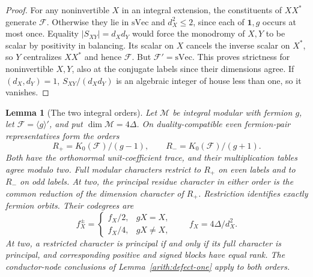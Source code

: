 \documentclass[11pt,a4paper]{article}
\numberwithin{equation}{section}
\newtheorem{lemma}[theorem]{Lemma}
\newcommand{\one}{\mathbf1}
\begin{document}
\begin{proof}
For any noninvertible $X$ in an integral extension, the constituents
of $XX^*$ generate $\mathcal F$. Otherwise they lie in
$\mathrm{sVec}$ and $d_X^2\le2$, since each of $\one,g$ occurs
at most once. Equality $|S_{XY}|=d_Xd_Y$ would force the monodromy
of $X,Y$ to be scalar by positivity in balancing. Its scalar on $X$
cancels the inverse scalar on $X^*$, so $Y$ centralizes $XX^*$
and hence $\mathcal F$. But $\mathcal F'=\mathrm{sVec}$.
This proves strictness for noninvertible $X,Y$, also at the conjugate
labels since their dimensions agree. If $(d_X,d_Y)=1$,
$S_{XY}/(d_Xd_Y)$ is an algebraic integer of house less than one,
so it vanishes.
\end{proof}

\begin{lemma}[The two integral orders]\label{loc:fermion-orders}
Let $\mathcal M$ be integral modular with fermion $g$, let
$\mathcal F=\langle g\rangle'$, and put
$\dim\mathcal M=4\Delta$. On duality-compatible even fermion-pair
representatives form the orders
\[
                 R_+=K_0(\mathcal F)/(g-1),\qquad
                 R_-=K_0(\mathcal F)/(g+1).
\]
Both have the orthonormal unit-coefficient trace, and their
multiplication tables agree modulo two. Full modular characters
restrict to $R_+$ on even labels and to $R_-$ on odd labels.
At two, the principal residue character in either order is the
common reduction of the dimension character of $R_+$.
Restriction identifies exactly fermion orbits. Their codegrees are
\begin{equation}\label{loc:restricted-codegrees}
 f_X^\pm=\begin{cases}f_X/2,&gX=X,\\f_X/4,&gX\ne X,
 \end{cases}\qquad f_X=4\Delta/d_X^2.
\end{equation}
At two, a restricted character is principal if and only if its
full character is principal, and corresponding positive and signed
blocks have equal rank. The conductor-node conclusions of
Lemma~\ref{arith:defect-one} apply to both orders.
\end{lemma}
\end{document}
